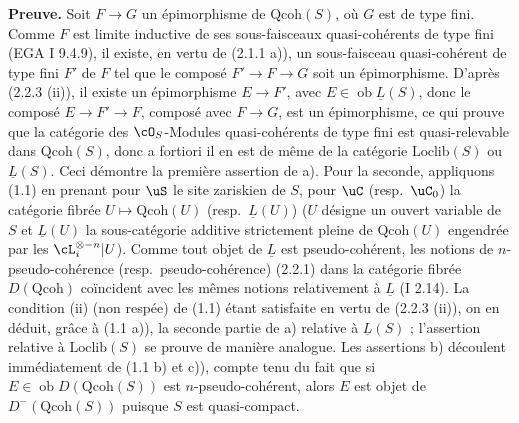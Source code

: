 \noindent\textbf{Preuve.} Soit $F \rightarrow G$ un \'{e}pimorphisme de $\mathrm{Qcoh}(S)$, o\`{u} $G$ est de type fini. Comme $F$ est limite inductive de ses sous-faisceaux quasi-coh\'{e}rents de type fini (EGA I 9.4.9), il existe, en vertu de (2.1.1 a)), un sous-faisceau quasi-coh\'{e}rent de type fini $F'$ de $F$ tel que le compos\'{e} $F' \rightarrow F \rightarrow G$ soit un \'{e}pimorphisme. D'apr\`{e}s (2.2.3 (ii)), il existe un \'{e}pimorphisme $E \rightarrow F'$, avec $E \in \operatorname{ob} \underline{L}(S)$, donc le compos\'{e} $E \rightarrow F' \rightarrow F$, compos\'{e} avec $F \rightarrow G$, est un \'{e}pimorphisme, ce qui prouve que la cat\'{e}gorie des $\cO_S$-Modules quasi-coh\'{e}rents de type fini est quasi-relevable dans $\mathrm{Qcoh}(S)$, donc a fortiori il en est de m\^{e}me de la cat\'{e}gorie $\mathrm{Loclib}(S)$ ou $\underline{L}(S)$. Ceci d\'{e}montre la premi\`{e}re assertion de a). Pour la seconde, appliquons (1.1) en prenant pour $\uS$ le site zariskien de $S$, pour $\uC$ (resp.~$\uC_0$) la cat\'{e}gorie fibr\'{e}e $U \mapsto \mathrm{Qcoh}(U)$ (resp.~$\underline{L}(U)$) ($U$ d\'{e}signe un ouvert variable de $S$ et $\underline{L}(U)$ la sous-cat\'{e}gorie additive strictement pleine de $\mathrm{Qcoh}(U)$ engendr\'{e}e par les $\cL_i^{\otimes -n}|U$). Comme tout objet de $\underline{L}$ est pseudo-coh\'{e}rent, les notions de $n$-pseudo-coh\'{e}rence (resp.~pseudo-coh\'{e}rence) (2.2.1) dans la cat\'{e}gorie fibr\'{e}e $D(\mathrm{Qcoh})$ co\"{i}ncident avec les m\^{e}mes notions relativement \`{a} $\underline{L}$ (I 2.14). La condition (ii) (non resp\'{e}e) de (1.1) \'{e}tant satisfaite en vertu de (2.2.3 (ii)), on en d\'{e}duit, gr\^{a}ce \`{a} (1.1 a)), la seconde partie de a) relative \`{a} $\underline{L}(S)$ ; l'assertion relative \`{a} $\mathrm{Loclib}(S)$ se prouve de mani\`{e}re analogue. Les assertions b) d\'{e}coulent imm\'{e}diatement de (1.1 b) et c)), compte tenu du fait que si $E \in \operatorname{ob} D(\mathrm{Qcoh}(S))$ est $n$-pseudo-coh\'{e}rent, alors $E$ est objet de $D^-(\mathrm{Qcoh}(S))$ puisque $S$ est quasi-compact.

